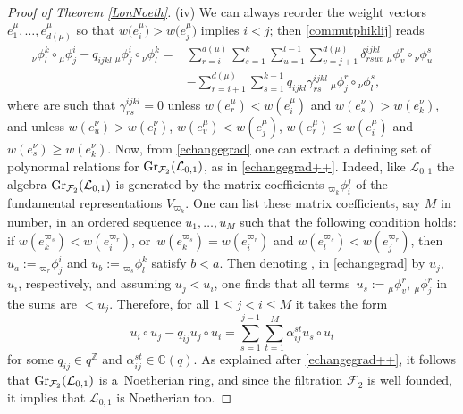 \documentclass[pdftex]{sigma}
\numberwithin{equation}{section}
\theoremstyle{definition}
\newcommand{\mc}{\mathbb{C}}
\newcommand{\mz}{\mathbb{Z}}
\newcommand{\Ll}{{\mathcal L}}
\begin{document}
\begin{proof}[Proof of Theorem \ref{LonNoeth}]
(iv) We can always reorder the weight vectors $e_1^\mu,\dots,e_{d(\mu)}^\mu$ so that $w\big(e_i^\mu\big) > w\big(e_j^\mu\big)$ implies $i < j$; then \eqref{commutphiklij} reads
\begin{align}
{}_{{\nu}}\phi^k_l \circ {}_{{\mu}}\phi^i_j - q_{ijkl} \ {}_{{\mu}}\phi^i_j\circ {}_{{\nu}}\phi^k_l ={}& \sum_{r=i}^{d(\mu)}\sum_{s=1}^k \sum_{u=1}^{l-1} \sum_{v=j+1}^{d(\mu)} \delta^{ijkl}_{rsuv} \ {}_{\mu}\phi^r_v \circ {}_{{\nu}}\phi^s_u \nonumber\\
 & - \sum_{r=i+1}^{d(\mu)}\sum_{s=1}^{k-1} q_{ijkl}\gamma_{rs}^{ijkl} \ {}_{\mu}\phi^r_j \circ {}_{{\nu}}\phi^s_l, \label{echangegrad}
\end{align}
where \smash{$\gamma_{rs}^{ijkl}, \delta^{ijkl}_{rsuv}\in \mc(q)$} are such that $\gamma_{rs}^{ijkl}=0$ unless $w(e_r^\mu) < w(e_i^\mu)$ and $w(e_s^\nu) > w(e_k^\nu)$, and  unless $w(e_u^\nu) > w(e_l^\nu)$, $w(e_v^\mu) < w(e_j^\mu)$, $w(e_r^\mu) \leq w(e_i^\mu)$ and $w(e_s^\nu) \geq w(e_k^\nu)$. Now, from \eqref{echangegrad} one can extract a defining set of polynormal relations for $ {\rm Gr}_{{\mathcal F}_2}({\mathcal L}_{0,1})$, as in \eqref{echangegrad++}. Indeed, like ${\mathcal L}_{0,1}$ the algebra $ {\rm Gr}_{{\mathcal F}_2}({\mathcal L}_{0,1})$ is generated by the matrix coefficients ${}_{{\varpi_k}} \phi_i^j$ of the fundamental representations $V_{\varpi_k}$. One can list these matrix coefficients, say $M$ in number, in an ordered sequence $u_1,\dots,u_M$ such that the following condition holds: if $w(e_k^{\varpi_s}) < w(e_i^{\varpi_r})$, or~${w(e_k^{\varpi_s}) = w(e_i^{\varpi_r})}$ and $w(e_l^{\varpi_s}) < w(e_j^{\varpi_r})$, then $u_a:={}_{{\varpi_r}} \phi^i_j$ and $u_b:={}_{{\varpi_s}} \phi^k_l$ satisfy $b<a$. Then denoting ,  in \eqref{echangegrad} by $u_j$, $u_i$, respectively, and assuming $u_j<u_i$, one finds that all terms~${u_s:= {}_{\mu}\phi^r_v}$, ${}_{\mu}\phi^r_j$ in the sums are $< u_j$. Therefore, for all $1\leq j<i\leq M$ it takes the form
\begin{equation}\label{echangegrad+}
u_i\circ u_j - q_{ij} u_j\circ u_i = \sum_{s=1}^{j-1}\sum_{t=1}^M \alpha_{ij}^{st} u_s\circ u_t
\end{equation}
for some $q_{ij}\in q^{\mz}$ and $\alpha_{ij}^{st}\in \mc(q)$. As explained after \eqref{echangegrad++}, it follows that $ {\rm Gr}_{{\mathcal F}_2}({\mathcal L}_{0,1})$ is a~Noetherian ring, and since the filtration $\mathcal{F}_2$ is well founded, it implies that $\Ll_{0,1}$ is Noetherian too.


\end{proof}
\end{document}

